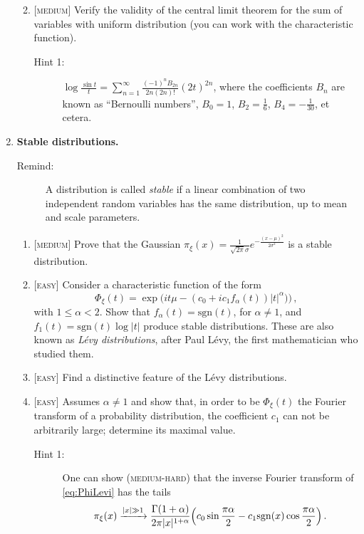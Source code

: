 \documentclass{article}
\newcommand{\be}{\begin{equation}}
\newcommand{\ee}{\end{equation}}
\newcommand{\1}{{\rm I}}
\begin{document}
\begin{enumerate}
\begin{enumerate}
\begin{description}
\end{description}
\item  \textsc{[medium]}  Verify the validity of the central limit theorem for the sum of variables with uniform distribution (you can work with the characteristic function). 
\begin{description}
\item[Hint 1:]$\log\frac{\sin t}{t}=\sum_{n=1}^\infty \frac{(-1)^n B_{2n}}{2n (2n)!}  (2t)^{2n} $, where the coefficients $B_n$ are known as ``Bernoulli numbers'', $B_0 = 1$, $B_2=\frac{1}{6}$, $B_4=-\frac{1}{30}$, et cetera.
\end{description}
\end{enumerate}
\item \textbf{Stable distributions.}
\begin{description}
\item[Remind:] A distribution is called \emph{stable} if a linear combination of two independent random variables has the same distribution, up to mean and scale parameters. 
\end{description}
\begin{enumerate}
\item \textsc{[medium]} Prove that the Gaussian $\pi_\xi(x)=\frac{1}{\sqrt{2\pi}\sigma}e^{-\frac{(x-\mu)^2}{2\sigma^2}}$ is a stable distribution.
\item \textsc{[easy]} Consider a characteristic function of the form
\be\label{eq:PhiLevi}
\Phi_\xi(t)=\exp\bigl(i t \mu-(c_0+ic_1 f_\alpha (t))|t|^\alpha)\bigr)\, ,
\ee
with $1\leq \alpha< 2$. Show that $f_\alpha(t)=\mathrm{sgn}(t)$, for $\alpha\neq 1$, and $f_1(t)=\mathrm{sgn}(t)\log |t|$ produce stable distributions. These are also known as \emph{L\'evy distributions}, after Paul L\'evy, the first mathematician who studied them. 
\item \textsc{[easy]} Find a distinctive feature of the L\'evy  distributions.
\item \textsc{[easy]} Assumes $\alpha\neq 1$ and show that, in order to be $\Phi_\xi(t)$ the Fourier transform of a probability distribution, the coefficient $c_1$ can not be arbitrarily large; determine its maximal value. 
\begin{description}
\item[Hint 1:] One can show (\textsc{medium-hard}) that the inverse Fourier transform of \eqref{eq:PhiLevi} has the tails
\be
\pi_\xi(x)\xrightarrow{|x|\gg 1}
\frac{\Gamma(1+\alpha)}{2\pi |x|^{1+\alpha}}\Bigl(c_0\sin\frac{\pi\alpha}{2}-c_1\mathrm{sgn}(x)\cos\frac{\pi\alpha}{2}\Bigr)\, .
\ee
\end{description}
\end{enumerate}
\end{enumerate}
\end{document}
